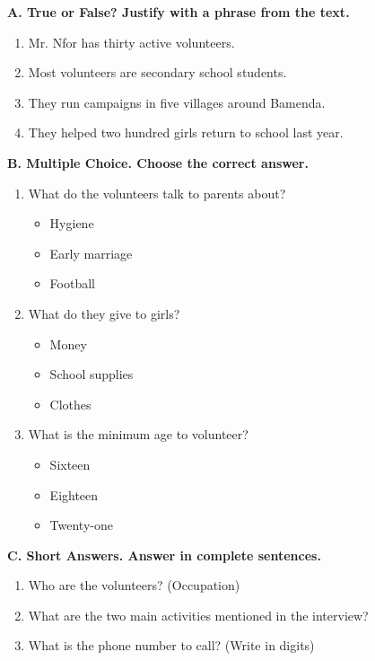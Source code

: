 \documentclass[11pt]{article}
\begin{document}
\begin{exercice}
\textbf{A. True or False? Justify with a phrase from the text.}
\begin{enumerate}
\item Mr. Nfor has thirty active volunteers.
\item Most volunteers are secondary school students.
\item They run campaigns in five villages around Bamenda.
\item They helped two hundred girls return to school last year.
\end{enumerate}

\textbf{B. Multiple Choice. Choose the correct answer.}
\begin{enumerate}
\item What do the volunteers talk to parents about?
      \begin{itemize}
      \item[a)] Hygiene
      \item[b)] Early marriage
      \item[c)] Football
      \end{itemize}
\item What do they give to girls?
      \begin{itemize}
      \item[a)] Money
      \item[b)] School supplies
      \item[c)] Clothes
      \end{itemize}
\item What is the minimum age to volunteer?
      \begin{itemize}
      \item[a)] Sixteen
      \item[b)] Eighteen
      \item[c)] Twenty-one
      \end{itemize}
\end{enumerate}

\textbf{C. Short Answers. Answer in complete sentences.}
\begin{enumerate}
\item Who are the volunteers? (Occupation)
\item What are the two main activities mentioned in the interview?
\item What is the phone number to call? (Write in digits)
\end{enumerate}
\end{exercice}
\end{document}
